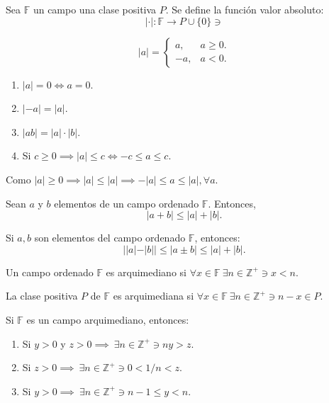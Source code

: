 \begin{definicion}
	Sea $\mathbb{F}$ un campo una clase positiva $P$. Se define la función valor absoluto: 
	$$|\cdot |:\mathbb{F}\to P\cup \{0\}\ni$$
	
	$$|a|=\begin{cases}
		a, & a\geq 0.\\
		-a, & a<0.
	\end{cases}$$
\end{definicion}


\begin{teorema}
	\begin{enumerate}
			\item $|a|=0\iff a=0$. 
		\item $|-a|=|a|$. 
		\item $|ab|=|a|\cdot |b|$. 
		\item Si $c\geq 0\implies |a|\leq c \iff -c\leq a\leq c$. 
	\end{enumerate}
\end{teorema}

\begin{nota}
	Como $|a|\geq 0\implies |a|\leq |a|\implies -|a|\leq a\leq |a|, \forall a$. 
\end{nota}

\begin{teorema}
	Sean $a$ y $b$ elementos de un campo ordenado $\mathbb{F}$. Entonces, 
	$$|a+b|\leq |a|+|b|.$$
\end{teorema}

\begin{nota}
	Si $a,b$ son elementos del campo ordenado $\mathbb{F}$, entonces:
	$$||a|-|b||\leq |a\pm b|\leq |a|+|b|.$$
\end{nota}

\begin{definicion}
	Un campo ordenado $\mathbb{F}$ es arquimediano si $\forall x\in \mathbb{F} \ \exists n\in\mathbb{Z}^+\ni x<n$.
\end{definicion}

\begin{nota}
	La clase positiva $P$ de $\mathbb{F}$ es arquimediana si $\forall x\in\mathbb{F} \ \exists n \in \mathbb{Z}^+ \ni n-x\in P$. 
\end{nota}

\begin{teorema}
	Si $\mathbb{F}$ es un campo arquimediano, entonces: 
	\begin{enumerate}
		\item Si $y>0$ y $z>0\implies \ \exists n \in \mathbb{Z}^+\ni ny>z$. 
		\item Si $z>0\implies \ \exists n\in \mathbb{Z}^+ \ni 0 < 1/n<z$. 
		\item Si $y>0\implies \ \exists n \in \mathbb{Z}^+ \ni n-1\leq y <n$. 
	\end{enumerate}
\end{teorema}


